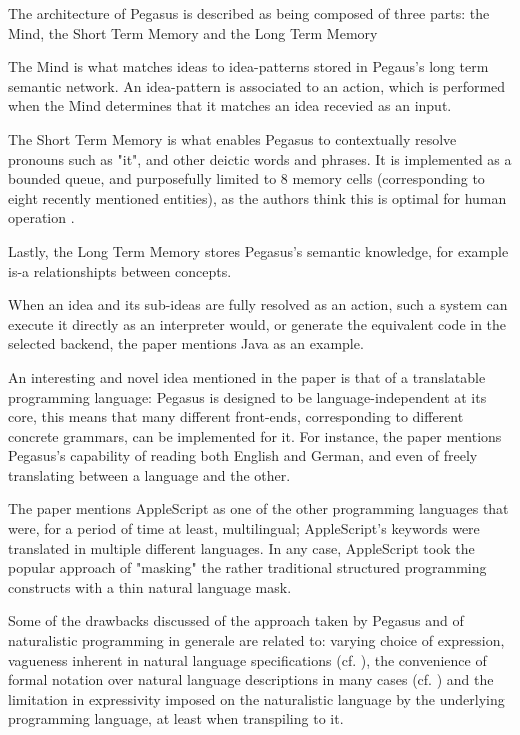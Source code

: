 The architecture of Pegasus is described as being composed of three parts: the Mind, the Short Term Memory and the Long Term Memory

The Mind is what matches ideas to idea-patterns stored in Pegaus's long term semantic network. An idea-pattern is associated to an action, which is performed when the Mind determines that it matches an idea recevied as an input.

The Short Term Memory is what enables Pegasus to contextually resolve pronouns such as "it", and other deictic words and phrases. It is implemented as a bounded queue, and purposefully limited to 8 memory cells (corresponding to eight recently mentioned entities), as the authors think this is optimal for human operation \cite{knoll2006pegasus}. 

Lastly, the Long Term Memory stores Pegasus's semantic knowledge, for example is-a relationshipts between concepts.

When an idea and its sub-ideas are fully resolved as an action, such a system can execute it directly as an interpreter would, or generate the equivalent code in the selected backend, the paper mentions Java as an example.

An interesting and novel idea mentioned in the paper is that of a translatable programming language: Pegasus is designed to be language-independent at its core, this means that many different front-ends, corresponding to different concrete grammars, can be implemented for it. For instance, the paper mentions Pegasus's capability of reading both English and German, and even of freely translating between a language and the other.

The paper mentions AppleScript as one of the other programming languages that were, for a period of time at least, multilingual; AppleScript's keywords were translated in multiple different languages. In any case, AppleScript took the popular approach of "masking" the rather traditional structured programming constructs with a thin natural language mask.

Some of the drawbacks discussed of the approach taken by Pegasus and of naturalistic programming in generale are related to: varying choice of expression, vagueness inherent in natural language specifications (cf. \cite{fantechi2021language}), the convenience of formal notation over natural language descriptions in many cases (cf. \cite{foolishnessnatprogramming}) and the limitation in expressivity imposed on the naturalistic language by the underlying programming language, at least when transpiling to it.

